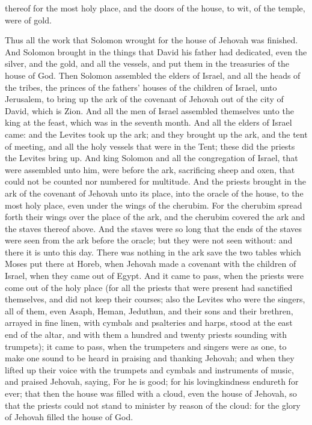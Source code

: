thereof for the most holy place, and the doors of the house, to wit, of the temple, were of gold. 

Thus all the work that Solomon wrought for the house of Jehovah was finished. And Solomon brought in the things that David his father had dedicated, even the silver, and the gold, and all the vessels, and put them in the treasuries of the house of God.  Then Solomon assembled the elders of Israel, and all the heads of the tribes, the princes of the fathers’ houses of the children of Israel, unto Jerusalem, to bring up the ark of the covenant of Jehovah out of the city of David, which is Zion. And all the men of Israel assembled themselves unto the king at the feast, which was in the seventh month. And all the elders of Israel came: and the Levites took up the ark; and they brought up the ark, and the tent of meeting, and all the holy vessels that were in the Tent; these did the priests the Levites bring up. And king Solomon and all the congregation of Israel, that were assembled unto him, were before the ark, sacrificing sheep and oxen, that could not be counted nor numbered for multitude. And the priests brought in the ark of the covenant of Jehovah unto its place, into the oracle of the house, to the most holy place, even under the wings of the cherubim. For the cherubim spread forth their wings over the place of the ark, and the cherubim covered the ark and the staves thereof above. And the staves were so long that the ends of the staves were seen from the ark before the oracle; but they were not seen without: and there it is unto this day. There was nothing in the ark save the two tables which Moses put there at Horeb, when Jehovah made a covenant with the children of Israel, when they came out of Egypt.  And it came to pass, when the priests were come out of the holy place (for all the priests that were present had sanctified themselves, and did not keep their courses; also the Levites who were the singers, all of them, even Asaph, Heman, Jeduthun, and their sons and their brethren, arrayed in fine linen, with cymbals and psalteries and harps, stood at the east end of the altar, and with them a hundred and twenty priests sounding with trumpets); it came to pass, when the trumpeters and singers were as one, to make one sound to be heard in praising and thanking Jehovah; and when they lifted up their voice with the trumpets and cymbals and instruments of music, and praised Jehovah, saying, For he is good; for his lovingkindness endureth for ever; that then the house was filled with a cloud, even the house of Jehovah, so that the priests could not stand to minister by reason of the cloud: for the glory of Jehovah filled the house of God. 

